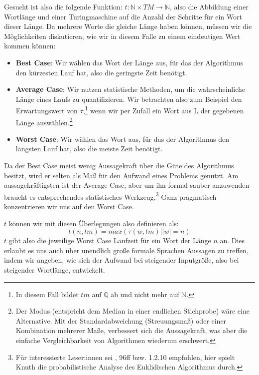 Gesucht ist also die folgende Funktion:
$t: \mathbb{N} \times TM \rightarrow \mathbb{N}$,
also die Abbildung einer Wortlänge und einer Turingmaschine
auf die Anzahl der Schritte für ein Wort dieser Länge.
Da mehrere Worte die gleiche Länge haben können,
müssen wir die Möglichkeiten diskutieren,
wie wir in diesem Falle zu einem eindeutigen Wert kommen können:
\begin{itemize}
    \item \textbf{Best Case}: Wir wählen das Wort der Länge aus,
        für das der Algorithmus den kürzesten Lauf hat,
        also die geringste Zeit benötigt.
    \item \textbf{Average Case}: Wir nutzen statistische Methoden,
        um die wahrscheinliche Länge eines Laufs zu quantifizieren.
        Wir betrachten also zum Beispiel den Erwartungswert von $\tau$,\footnote{
            In diesem Fall bildet $tm$ auf $\mathbb{Q}$ ab und nicht mehr auf $\mathbb{N}$.}
        wenn wir per Zufall ein Wort aus L der gegebenen Länge auswählen.\footnote{
            Der Modus (entspricht dem Median in einer endlichen Stichprobe) wäre eine Alternative.
        Mit der Standardabweichung (Streuungsmaß) oder einer Kombination mehrerer Maße,
        verbessert sich die Aussagekraft,
        was aber die einfache Vergleichbarkeit von Algorithmen wiederum erschwert.}

    \item \textbf{Worst Case}: Wir wählen das Wort aus,
        für das der Algorithmus den längsten Lauf hat,
        also die meiste Zeit benötigt.
\end{itemize} 

Da der Best Case meist wenig Aussagekraft über die Güte des Algorithmus besitzt,
wird er selten als Maß für den Aufwand eines Problems genutzt.
Am aussagekräftigsten ist der Average Case,
aber um ihn formal sauber anzuwenden braucht es
entsprechendes statistisches Werkzeug.\footnote{
    Für interessierte Leser:innen sei \cite{knuth1}, 96ff bzw. 1.2.10 empfohlen,
    hier spielt Knuth die probabilistische Analyse des Euklidischen Algorithmus durch.} 
Ganz pragmatisch konzentrieren wir uns auf den Worst Case.


$t$ können wir mit diesen Überlegungen also definieren als:
\[
t(n, tm) = max({\tau(w, tm)| |w| = n})
\]
$t$ gibt also die jeweilige Worst Case Laufzeit für ein Wort der Länge $n$ an.
Dies erlaubt es uns auch über unendlich große formale Sprachen Aussagen zu treffen,
indem wir angeben,
wie sich der Aufwand bei steigender Inputgröße,
also bei steigender Wortlänge, entwickelt.

